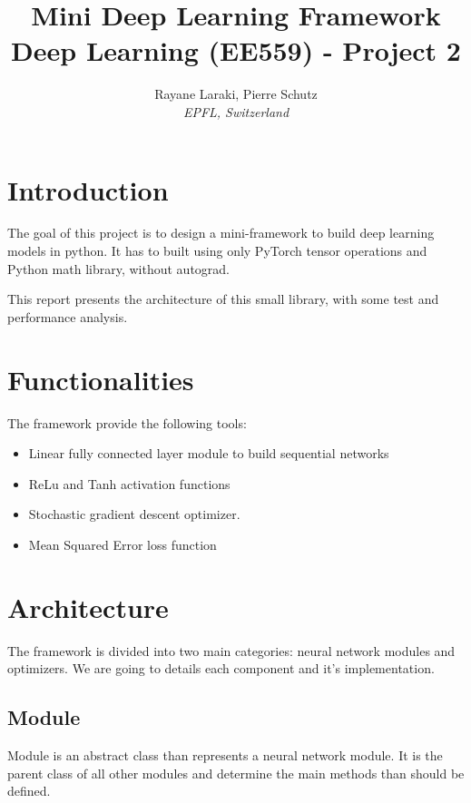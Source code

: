 \documentclass[10pt,conference,compsocconf]{IEEEtran}
\begin{document}
\title{ Mini Deep Learning Framework \\ Deep Learning (EE559) - Project 2 }

\author{
  Rayane Laraki, Pierre Schutz\\
  \textit{EPFL, Switzerland}
}


\maketitle

\section{Introduction}

The goal of this project is to design a mini-framework to build deep learning models in python. 
It has to built using only PyTorch tensor operations and Python math library, without autograd. 

This report presents the architecture of this small library, with some test and performance analysis.

\section{Functionalities}

The framework provide the following tools:
\begin{itemize}
    \item Linear fully connected layer module to build sequential networks
    \item ReLu and Tanh activation functions
    \item Stochastic gradient descent optimizer.
    \item Mean Squared Error loss function
\end{itemize}


\section{Architecture}

The framework is divided into two main categories: neural network modules and optimizers. We are going to details each component and it's implementation.

\subsection{Module}

Module is an abstract class than represents a neural network module. It is the parent class of all other modules and determine the main methods than should be defined. 
\end{document}
